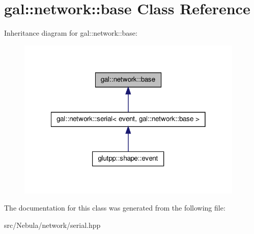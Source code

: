 \hypertarget{classgal_1_1network_1_1base}{\section{gal\-:\-:network\-:\-:base \-Class \-Reference}
\label{classgal_1_1network_1_1base}
}


\-Inheritance diagram for gal\-:\-:network\-:\-:base\-:\nopagebreak
\begin{figure}[H]
\begin{center}
\leavevmode
\includegraphics[width=306pt]{classgal_1_1network_1_1base__inherit__graph}
\end{center}
\end{figure}


\-The documentation for this class was generated from the following file\-:\begin{DoxyCompactItemize}
\item 
src/\-Nebula/network/serial.\-hpp\end{DoxyCompactItemize}
